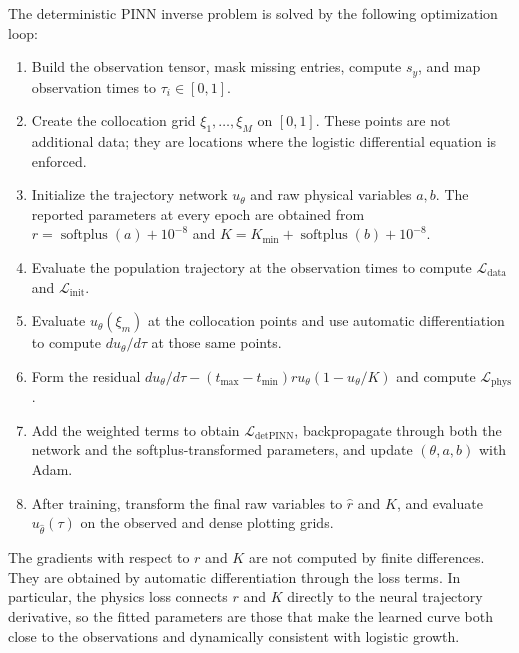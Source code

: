 The deterministic PINN inverse problem is solved by the following optimization
loop:
\begin{enumerate}
  \item Build the observation tensor, mask missing entries, compute $s_y$, and
        map observation times to $\tau_i\in[0,1]$.
  \item Create the collocation grid
        $\xi_1,\ldots,\xi_M$ on $[0,1]$. These points are not additional data;
        they are locations where the logistic differential equation is
        enforced.
  \item Initialize the trajectory network $u_\theta$ and raw physical variables
        $a,b$. The reported parameters at every epoch are obtained from
        $r=\operatorname{softplus}(a)+10^{-8}$ and
        $K=K_{\min}+\operatorname{softplus}(b)+10^{-8}$.
  \item Evaluate the population trajectory at the observation times to compute
        $\mathcal L_{\mathrm{data}}$ and $\mathcal L_{\mathrm{init}}$.
  \item Evaluate $u_\theta(\xi_m)$ at the collocation points and use automatic
        differentiation to compute $du_\theta/d\tau$ at those same points.
  \item Form the residual
        $du_\theta/d\tau-(t_{\max}-t_{\min})r u_\theta(1-u_\theta/K)$ and
        compute
        $\mathcal L_{\mathrm{phys}}$.
  \item Add the weighted terms to obtain
        $\mathcal L_{\mathrm{detPINN}}$, backpropagate through both the
        network and the softplus-transformed parameters, and update
        $(\theta,a,b)$ with Adam.
  \item After training, transform the final raw variables to
        $\widehat r$ and $\widehat K$, and evaluate $u_{\widehat\theta}(\tau)$
        on the observed and dense plotting grids.
\end{enumerate}

The gradients with respect to $r$ and $K$ are not computed by finite
differences. They are obtained by automatic differentiation through the loss
terms. In particular, the physics loss connects $r$ and $K$ directly to the
neural trajectory derivative, so the fitted parameters are those that make the
learned curve both close to the observations and dynamically consistent with
logistic growth.